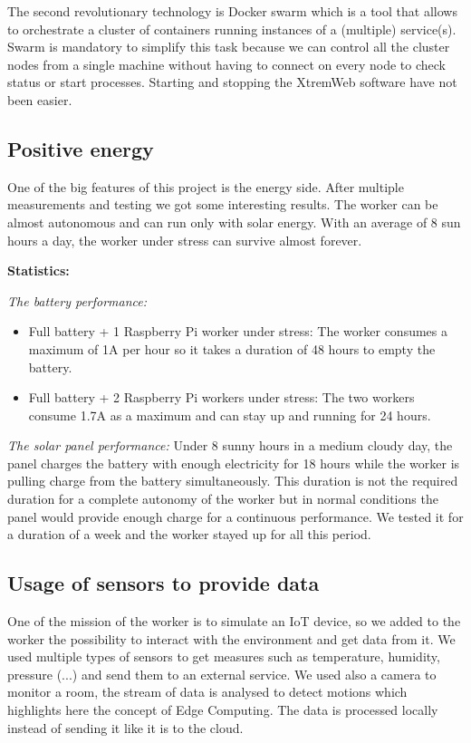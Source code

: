     The second revolutionary technology is Docker swarm which is a tool that allows to orchestrate a cluster
    of containers running instances of a (multiple) service(s). Swarm is mandatory to simplify this task
    because we can control all the cluster nodes from a single machine without having to connect on every node
    to check status or start processes. Starting and stopping the XtremWeb software have not been easier.

    \subsection{Positive energy}
    One of the big features of this project is the energy side. After multiple measurements and
    testing we got some interesting results. The worker can be almost autonomous and can run only with solar
    energy. With an average of 8 sun hours a day, the worker under stress can survive almost forever.

    \textbf{Statistics:}

    \textit{The battery performance:}

    \begin{itemize}
        \item Full battery + 1 Raspberry Pi worker under stress: The worker consumes a maximum of 1A per hour
        so it takes a duration of 48 hours to empty the battery.

        \item Full battery + 2 Raspberry Pi workers under stress: The two workers consume 1.7A as a maximum and
        can stay up and running for 24 hours.
    \end{itemize}

    \textit{The solar panel performance:}
    Under 8 sunny hours in a medium cloudy day, the panel charges the battery with enough electricity for 18
    hours while the worker is pulling charge from the battery simultaneously. This duration is not the required
    duration for a complete autonomy of the worker but in normal conditions the panel would provide enough
    charge for a continuous performance. We tested it for a duration of a week and the worker stayed up for
    all this period.

    \subsection{Usage of sensors to provide data}
    One of the mission of the worker is to simulate an IoT device, so we added to the worker the possibility
    to interact with the environment and get data from it. We used multiple types of sensors to get measures
    such as temperature, humidity, pressure (...) and send them to an external service. We used also a camera
    to monitor a room, the stream of data is analysed to detect motions which highlights here the concept
    of Edge Computing. The data is processed locally instead of sending it like it is to the cloud.


